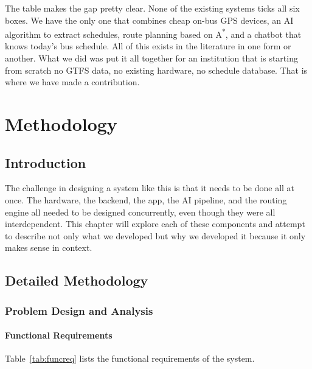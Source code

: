 \documentclass[12pt,a4paper]{report}
\begin{document}
The table makes the gap pretty clear. None of the existing systems ticks all six boxes. We have the only one that combines cheap on-bus GPS devices, an AI algorithm to extract schedules, route planning based on A\textsuperscript{*}, and a chatbot that knows today's bus schedule. All of this exists in the literature in one form or another. What we did was put it all together for an institution that is starting from scratch no GTFS data, no existing hardware, no schedule database. That is where we have made a contribution.

\chapter{Methodology}

\section{Introduction}

The challenge in designing a system like this is that it needs to be done all at once. The hardware, the backend, the app, the AI pipeline, and the routing engine all needed to be designed concurrently, even though they were all interdependent. This chapter will explore each of these components and attempt to describe not only what we developed but why we developed it because it only makes sense in context.

\section{Detailed Methodology}

\subsection{Problem Design and Analysis}

\subsubsection{Functional Requirements}

Table~\ref{tab:funcreq} lists the functional requirements of the system.
\end{document}
